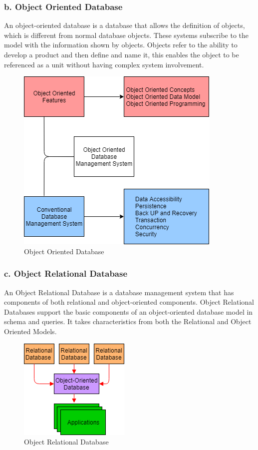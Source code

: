 \documentclass[BTech]{srmuthesis}
\begin{document}
\subsubsection{b. Object Oriented Database}
An object-oriented database is a database that allows the definition of objects, which is different from normal database objects. These systems subscribe to the model with the information shown by objects. Objects refer to the ability to develop a product and then define and name it, this enables the object to be referenced as a unit without having complex system involvement.
\begin{figure}[h!]
	\centering
	\includegraphics[scale=0.7]{OODB.png}
	\caption{Object Oriented Database}
\end{figure}
\subsubsection{c. Object Relational Database}
An Object Relational Database is a database management system that has components of both relational and object-oriented components. Object Relational Databases support the basic components of an object-oriented database model in schema and queries. It takes characteristics from both the Relational and Object Oriented Models.
\begin{figure}[h!]
	\centering
	\includegraphics[scale=1.0]{ORD.png}
	\caption{Object Relational Database}
\end{figure}
\end{document}
